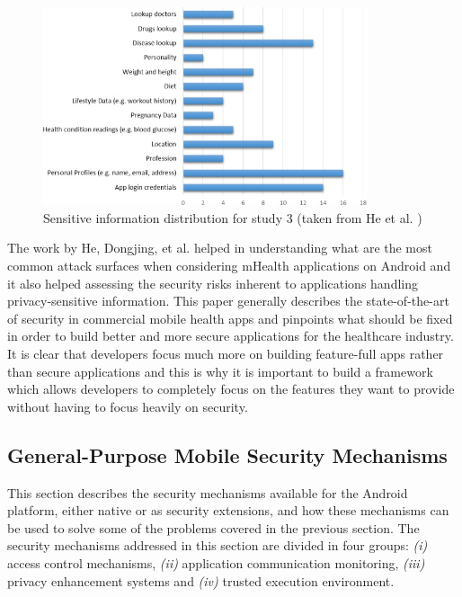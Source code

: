 \begin{figure}[t!]
  \centering
  \includegraphics[width=0.85\textwidth]{img/sensitivedistribution.jpg}
  \caption{Sensitive information distribution for study 3 (taken from  He et al. \cite{he2014security})}
  \label{fig:sensitivedistribution}
\end{figure}

The work by He, Dongjing, et al. \cite{he2014security} helped in understanding what are the most common attack surfaces when considering mHealth applications on Android and it also helped assessing the security risks inherent to applications handling privacy-sensitive information. This paper generally describes the state-of-the-art of security in commercial mobile health apps and pinpoints what should be fixed in order to build better and more secure applications for the healthcare industry.
It is clear that developers focus much more on building feature-full apps rather than secure applications and this is why it is important to build a framework which allows developers to completely focus on the features they want to provide without having to focus heavily on security. 

\subsection{General-Purpose Mobile Security Mechanisms}

This section describes the security mechanisms available for the Android platform, either native or as security extensions, and how these mechanisms can be used to solve some of the problems covered in the previous section. The security mechanisms addressed in this section are divided in four groups: \emph{(i)} access control mechanisms, \emph{(ii)} application communication monitoring, \emph{(iii)} privacy enhancement systems and \emph{(iv)} trusted execution environment.

